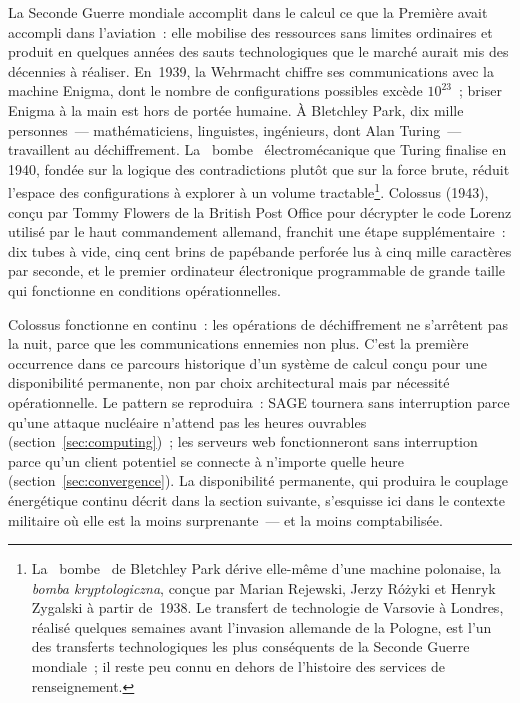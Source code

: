 %
La Seconde Guerre mondiale accomplit dans le calcul ce que la Première avait accompli dans l'aviation~: elle mobilise des ressources sans limites ordinaires et produit en quelques années des sauts technologiques que le marché aurait mis des décennies à réaliser. En~1939, la Wehrmacht chiffre ses communications avec la machine Enigma, dont le nombre de configurations possibles excède $10^{23}$~; briser Enigma à la main est hors de portée humaine. À Bletchley Park, dix mille personnes~--- mathématiciens, linguistes, ingénieurs, dont Alan Turing~--- travaillent au déchiffrement. La \og~bombe~\fg{} électromécanique que Turing finalise en 1940, fondée sur la logique des contradictions plutôt que sur la force brute, réduit l'espace des configurations à explorer à un volume tractable\footnote{La \og~bombe~\fg{} de Bletchley Park dérive elle-même d'une machine polonaise, la \emph{bomba kryptologiczna}, conçue par Marian Rejewski, Jerzy Różyki et Henryk Zygalski à partir de~1938. Le transfert de technologie de Varsovie à Londres, réalisé quelques semaines avant l'invasion allemande de la Pologne, est l'un des transferts technologiques les plus conséquents de la Seconde Guerre mondiale~; il reste peu connu en dehors de l'histoire des services de renseignement.}. Colossus (1943), conçu par Tommy Flowers de la British Post Office pour décrypter le code Lorenz utilisé par le haut commandement allemand, franchit une étape supplémentaire~: dix tubes à vide, cinq cent brins de papébande perforée lus à cinq mille caractères par seconde, et le premier ordinateur électronique programmable de grande taille qui fonctionne en conditions opérationnelles.

%
Colossus fonctionne en continu~: les opérations de déchiffrement ne s'arrêtent pas la nuit, parce que les communications ennemies non plus. C'est la première occurrence dans ce parcours historique d'un système de calcul conçu pour une disponibilité permanente, non par choix architectural mais par nécessité opérationnelle. Le pattern se reproduira~: SAGE tournera sans interruption parce qu'une attaque nucléaire n'attend pas les heures ouvrables (section~\ref{sec:computing})~; les serveurs web fonctionneront sans interruption parce qu'un client potentiel se connecte à n'importe quelle heure (section~\ref{sec:convergence}). La disponibilité permanente, qui produira le couplage énergétique continu décrit dans la section suivante, s'esquisse ici dans le contexte militaire où elle est la moins surprenante~--- et la moins comptabilisée.

